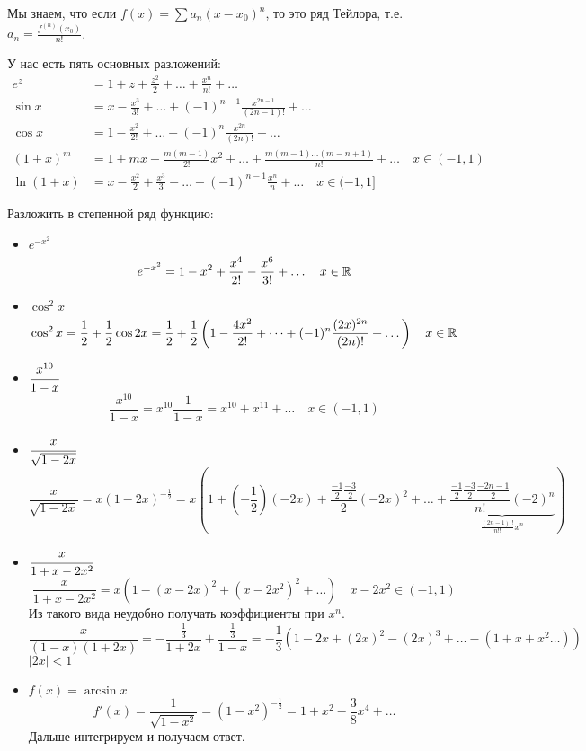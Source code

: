 Мы знаем, что если \(f(x) = \sum a_n(x - x_0)^n\), то это ряд Тейлора, т.е. \(a_n = \frac{f^{(n)} (x_0)}{n!} \).

У нас есть пять основных разложений:
\begin{align*}
    e^z        & = 1 + z + \frac{z^2}{2} + \dots + \frac{x^n}{n!} + \dots                                                    \\
    \sin x     & = x - \frac{x^3}{3!} + \dots + ( - 1)^{n - 1} \frac{x^{2n - 1}}{(2n - 1)!} + \dots                          \\
    \cos x     & = 1 - \frac{x^2}{2!} + \dots + ( - 1)^n \frac{x^{2n}}{(2n)!} + \dots                                        \\
    (1 + x)^m  & = 1 + mx + \frac{m(m - 1)}{2!}x^2 + \dots + \frac{m(m - 1)\dots(m - n + 1)}{n!} + \dots \quad x\in( - 1, 1) \\
    \ln(1 + x) & = x - \frac{x^2}{2} + \frac{x^3}{3} - \dots + ( - 1)^{n - 1}\frac{x^n}{n} + \dots \quad x\in( - 1, 1]
\end{align*}

\begin{exercise}[2851-\dots]
    Разложить в степенной ряд функцию:
    \begin{itemize}
        \item \(e^{ - x^2}\)
              \[e^{ - x^2} = 1 - x^2 + \frac{x^4}{2!} - \frac{x^6}{3!} + \dots \quad x\in\mathbb{R}\]
        \item \(\cos^2 x\)
              \[\cos^2x = \frac{1}{2} + \frac{1}{2}\cos 2x = \frac{1}{2} + \frac{1}{2}\left( 1 - \frac{4x^2}{2!} + \dots + ( - 1)^n \frac{(2x)^{2n}}{(2n)!} + \dots \right) \quad x\in\mathbb{R}\]
        \item \(\cfrac{x^{10}}{1 - x}\)
              \[\frac{x^{10}}{1 - x} = x^{10} \frac{1}{1 - x} = x^{10} + x^{11} + \dots \quad x\in ( - 1, 1)\]
        \item \(\cfrac{x}{\sqrt{1 - 2x}}\)
              \[\frac{x}{\sqrt{1 - 2x}} = x(1 - 2x)^{ - \frac{1}{2}} = x\left( 1 + \left( - \frac{1}{2} \right)( - 2x) + \frac{\frac{ - 1}{2} \frac{ - 3}{2} }{2} ( - 2x)^2 + \dots + \underbrace{\frac{\frac{ -1}{2} \frac{ - 3}{2} \frac{ - 2n - 1}{2}}{n!}( - 2)^n}_{\frac{(2n - 1)!!}{n!!}x^n } \right)\]
        \item \(\cfrac{x}{1 + x - 2x^2}\)
              \[\frac{x}{1 + x - 2x^2} = x(1 - (x - 2x)^2 + (x - 2x^2)^2 + \dots) \quad x - 2x^2\in( - 1, 1)\]
              Из такого вида неудобно получать коэффициенты при \(x^n\).
              \[\frac{x}{(1 - x)(1 + 2x)} = - \frac{\frac{1}{3}}{1 + 2x} + \frac{\frac{1}{3}}{1 - x} = - \frac{1}{3}\left( 1 - 2x + (2x)^2 - (2x)^3  + \dots - (1 + x + x^2 \dots )\right)\]
              \(|2x|< 1\)
        \item \(f(x) = \arcsin x\)
              \[f'(x) = \frac{1}{\sqrt{1 - x^2}} = (1 - x^2)^{ -\frac{1}{2}} = 1 + x^2 - \frac{3}{8} x^4 + \dots \]
              Дальше интегрируем и получаем ответ.
    \end{itemize}
\end{exercise}

